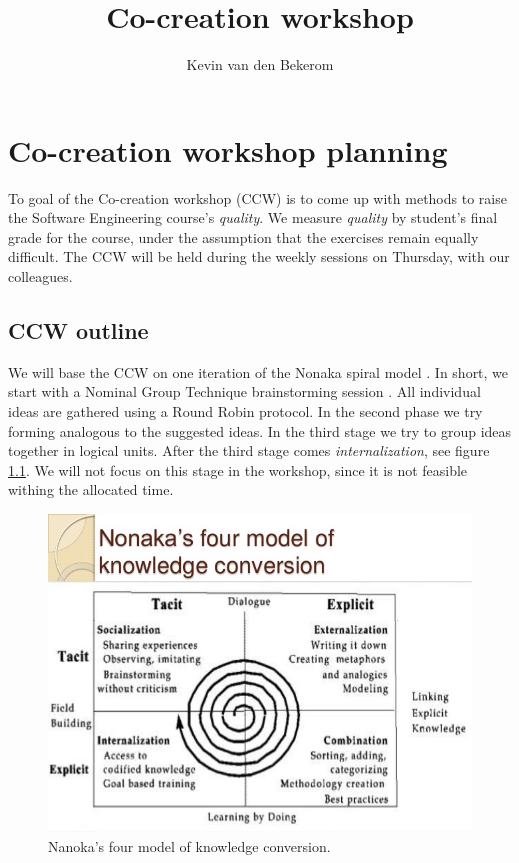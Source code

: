 

\title{Co-creation workshop}
\newcommand{\TitelAbbr}{}
\newcommand{\Version}{0.1}



\what{}
\supervisors{}
\author{Kevin van den Bekerom}




\maketitle

\clearpage


\chapter{Co-creation workshop planning}
To goal of the Co-creation workshop (CCW) is to come up with methods to raise the Software Engineering course's \textit{quality}.
We measure \textit{quality} by student's final grade for the course, under the assumption that the exercises remain equally difficult. The CCW will be held during the weekly sessions on Thursday, with our colleagues. \\

\section{CCW outline}
We will base the CCW on one iteration of the Nonaka spiral model \cite{nonaka}. In short, we start with a Nominal Group Technique brainstorming session \cite{NGT}. All individual ideas are gathered using a Round Robin protocol. In the second phase we try forming analogous to the suggested ideas. In the third stage we try to group ideas together in logical units. After the third stage comes \textit{internalization}, see figure \ref{fig:spiral}. We will not focus on this stage in the workshop, since it is not feasible withing the allocated time.

\begin{figure}[h]
	\centering
	\includegraphics[width=0.75\linewidth]{spiral.jpg}
	\caption{Nanoka's four model of knowledge conversion.}
	\label{fig:spiral}
\end{figure}  

